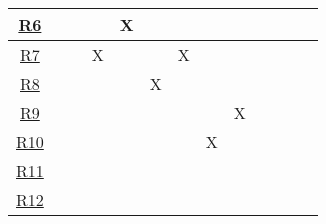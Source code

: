 \documentclass[12pt, titlepage]{article}
\begin{document}
\begin{table}[H]
\begin{tabular}{|c|cccccccccccc|}
\hyperref[R6]{R6} & \multicolumn{1}{c|}{}  & \multicolumn{1}{c|}{}  & \multicolumn{1}{c|}{}
& \multicolumn{1}{c|}{X}  & \multicolumn{1}{c|}{}  & \multicolumn{1}{c|}{}
& \multicolumn{1}{c|}{}  & \multicolumn{1}{c|}{}  & \multicolumn{1}{c|}{}
& \multicolumn{1}{c|}{}   & \multicolumn{1}{c|}{}   &    \\ \hline

\hyperref[R7]{R7} & \multicolumn{1}{c|}{}  & \multicolumn{1}{c|}{}  & \multicolumn{1}{c|}{X}
& \multicolumn{1}{c|}{}  & \multicolumn{1}{c|}{}  & \multicolumn{1}{c|}{X}
& \multicolumn{1}{c|}{}  & \multicolumn{1}{c|}{}  & \multicolumn{1}{c|}{}
& \multicolumn{1}{c|}{}   & \multicolumn{1}{c|}{}   &    \\ \hline

\hyperref[R8]{R8} & \multicolumn{1}{c|}{}  & \multicolumn{1}{c|}{}  & \multicolumn{1}{c|}{}
& \multicolumn{1}{c|}{}  & \multicolumn{1}{c|}{X}  & \multicolumn{1}{c|}{}
& \multicolumn{1}{c|}{}  & \multicolumn{1}{c|}{}  & \multicolumn{1}{c|}{}
& \multicolumn{1}{c|}{}   & \multicolumn{1}{c|}{}   &    \\ \hline

\hyperref[R9]{R9} & \multicolumn{1}{c|}{}  & \multicolumn{1}{c|}{}  & \multicolumn{1}{c|}{}
& \multicolumn{1}{c|}{}  & \multicolumn{1}{c|}{}  & \multicolumn{1}{c|}{}
& \multicolumn{1}{c|}{}  & \multicolumn{1}{c|}{X}  & \multicolumn{1}{c|}{}
& \multicolumn{1}{c|}{}   & \multicolumn{1}{c|}{}   &    \\ \hline

\hyperref[R10]{R10} & \multicolumn{1}{c|}{}  & \multicolumn{1}{c|}{}  & \multicolumn{1}{c|}{}
& \multicolumn{1}{c|}{}  & \multicolumn{1}{c|}{}  & \multicolumn{1}{c|}{}
& \multicolumn{1}{c|}{X}  & \multicolumn{1}{c|}{}  & \multicolumn{1}{c|}{}
& \multicolumn{1}{c|}{}   & \multicolumn{1}{c|}{}   &    \\ \hline

\hyperref[R11]{R11} & \multicolumn{1}{c|}{}  & \multicolumn{1}{c|}{}  & \multicolumn{1}{c|}{}
& \multicolumn{1}{c|}{}  & \multicolumn{1}{c|}{}  & \multicolumn{1}{c|}{}
& \multicolumn{1}{c|}{}  & \multicolumn{1}{c|}{}  & \multicolumn{1}{c|}{}
& \multicolumn{1}{c|}{}   & \multicolumn{1}{c|}{}   &    \\ \hline

\hyperref[R12]{R12} & \multicolumn{1}{c|}{}  & \multicolumn{1}{c|}{}  & \multicolumn{1}{c|}{}
& \multicolumn{1}{c|}{}  & \multicolumn{1}{c|}{}  & \multicolumn{1}{c|}{}
& \multicolumn{1}{c|}{}  & \multicolumn{1}{c|}{}  & \multicolumn{1}{c|}{}
& \multicolumn{1}{c|}{}   & \multicolumn{1}{c|}{}   &    \\ \hline


\end{tabular}
\end{table}
\end{document}
